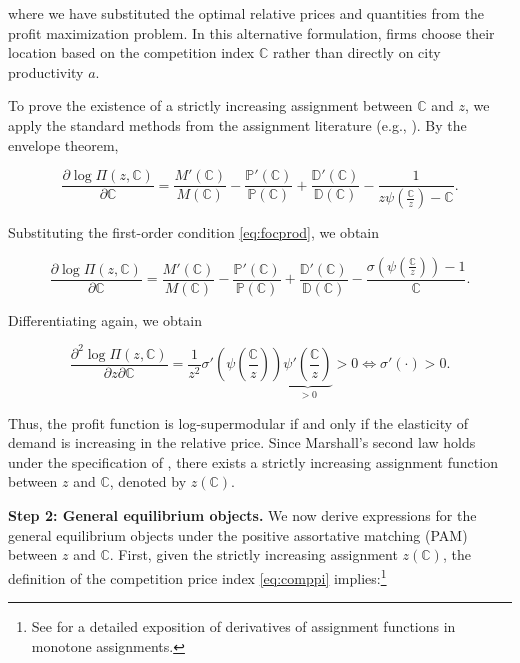 where we have substituted the optimal relative prices and quantities from the profit maximization problem. In this alternative formulation, firms choose their location based on the competition index $\mathbb{C}$ rather than directly on city productivity $a$.  

To prove the existence of a strictly increasing assignment between $\mathbb{C}$ and $z$, we apply the standard methods from the assignment literature (e.g., \textcite{Galichon16}). By the envelope theorem,  

\begin{equation*}
	\frac{\partial \log \Pi(z,\mathbb{C})}{\partial \mathbb{C}} = \frac{M'(\mathbb{C})}{M(\mathbb{C})} - \frac{\mathbb{P}'(\mathbb{C})}{\mathbb{P}(\mathbb{C})} + \frac{\mathbb{D}'(\mathbb{C})}{\mathbb{D}(\mathbb{C})} - \frac{1}{z\psi\left(\frac{{\mathbb{C}}}{z}\right) - \mathbb{C}}.
\end{equation*}

Substituting the first-order condition \eqref{eq:focprod}, we obtain  

\begin{equation*}
	\frac{\partial \log \Pi(z,\mathbb{C})}{\partial \mathbb{C}} = \frac{M'(\mathbb{C})}{M(\mathbb{C})} - \frac{\mathbb{P}'(\mathbb{C})}{\mathbb{P}(\mathbb{C})} + \frac{\mathbb{D}'(\mathbb{C})}{\mathbb{D}(\mathbb{C})} - \frac{\sigma\left(\psi\left(\frac{{\mathbb{C}}}{z}\right)\right) - 1}{\mathbb{C}}.
\end{equation*}

Differentiating again, we obtain  

\begin{equation*}
	\frac{\partial^2 \log \Pi(z,\mathbb{C})}{\partial z \partial \mathbb{C}} = \frac{1}{z^2} \sigma'\left(\psi\left(\frac{{\mathbb{C}}}{z}\right)\right) \underbrace{\psi'\left(\frac{{\mathbb{C}}}{z}\right)}_{>0} > 0 \iff \sigma'\left(\cdot\right) > 0.
\end{equation*}

Thus, the profit function is log-supermodular if and only if the elasticity of demand is increasing in the relative price. Since Marshall’s second law holds under the specification of \textcite{Klenow&Willis16}, there exists a strictly increasing assignment function between $z$ and $\mathbb{C}$, denoted by $z(\mathbb{C})$.  

\noindent \textbf{Step 2: General equilibrium objects.}  
We now derive expressions for the general equilibrium objects under the positive assortative matching (PAM) between $z$ and $\mathbb{C}$. First, given the strictly increasing assignment $z(\mathbb{C})$, the definition of the competition price index \eqref{eq:comppi} implies:\footnote{See \textcite{Costinot&Vogel10} for a detailed exposition of derivatives of assignment functions in monotone assignments.}  

